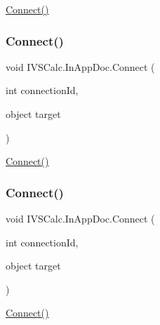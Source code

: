 \hyperlink{class_i_v_s_calc_1_1_in_app_doc_a470427a176a8d7a0de6c0b82a9a45c4b}{Connect()} 

\mbox{\label{class_i_v_s_calc_1_1_in_app_doc_a470427a176a8d7a0de6c0b82a9a45c4b}} 
\subsubsection{\texorpdfstring{Connect()}{Connect()}\hspace{0.1cm}{\footnotesize\ttfamily [2/5]}}
{\footnotesize\ttfamily void I\+V\+S\+Calc.\+In\+App\+Doc.\+Connect (\begin{DoxyParamCaption}\item[{int}]{connection\+Id,  }\item[{object}]{target }\end{DoxyParamCaption})}



\hyperlink{class_i_v_s_calc_1_1_in_app_doc_a470427a176a8d7a0de6c0b82a9a45c4b}{Connect()} 

\mbox{\label{class_i_v_s_calc_1_1_in_app_doc_a470427a176a8d7a0de6c0b82a9a45c4b}} 
\subsubsection{\texorpdfstring{Connect()}{Connect()}\hspace{0.1cm}{\footnotesize\ttfamily [3/5]}}
{\footnotesize\ttfamily void I\+V\+S\+Calc.\+In\+App\+Doc.\+Connect (\begin{DoxyParamCaption}\item[{int}]{connection\+Id,  }\item[{object}]{target }\end{DoxyParamCaption})}



\hyperlink{class_i_v_s_calc_1_1_in_app_doc_a470427a176a8d7a0de6c0b82a9a45c4b}{Connect()} 

\mbox{\label{class_i_v_s_calc_1_1_in_app_doc_a470427a176a8d7a0de6c0b82a9a45c4b}} 

